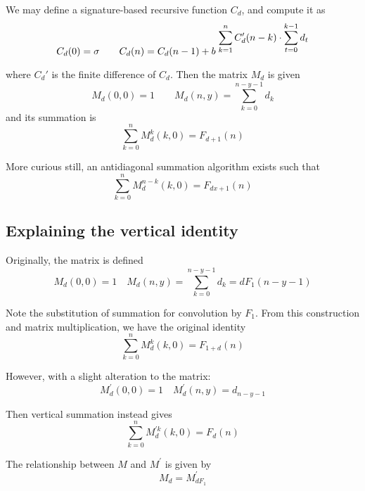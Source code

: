 \documentclass{article}
\begin{document}
We may define a signature-based recursive function $C_d$, and compute it as \begin{equation}C_d(0) = \sigma \qquad C_d(n) = C_d(n-1) + b^{\hspace{1mm} \displaystyle \sum_{k=1}^{n} C'_d(n-k) \cdot \sum_{t=0}^{k-1} d_{t}}\end{equation}

\noindent where $C_d'$ is the finite difference of $C_d$. Then the matrix $M_d$ is given \begin{equation}M_{d}(0,0) = 1 \qquad M_{d}(n, y) = \sum_{k=0}^{n-y-1} d_{k}\end{equation} and its summation is \begin{equation} \sum_{k=0}^{n} M_{d}^{k}(k, 0)= F_{d+1}(n)\end{equation}

\noindent More curious still, an antidiagonal summation algorithm exists such that \begin{equation}\sum_{k=0}^{n} M_{d}^{n-k}(k, 0) = F_{dx + 1}(n)\end{equation}

\subsection{Explaining the vertical identity}

\noindent Originally, the matrix is defined \begin{equation}M_d(0,0) = 1 \quad M_d(n,y) = \sum_{k=0}^{n-y-1} d_k = dF_1 (n - y - 1)\end{equation}

\noindent Note the substitution of summation for convolution by $F_1$. From this construction and matrix multiplication, we have the original identity \begin{equation}\sum_{k=0}^{n} M_d^{k} (k, 0) = F_{1+d} (n)\end{equation}

\noindent However, with a slight alteration to the matrix: \begin{equation}M_d^{\prime}(0, 0) = 1 \quad M_d^{\prime}(n,y) = d_{n-y-1}\end{equation}

\noindent Then vertical summation instead gives \begin{equation}\sum_{k=0}^{n} M_d^{\prime k} (k, 0) = F_d (n)\end{equation}

\noindent The relationship between $M$ and $M^{\prime}$ is given by \begin{equation}M_d = M_{dF_1}^{\prime}\end{equation}
\end{document}
